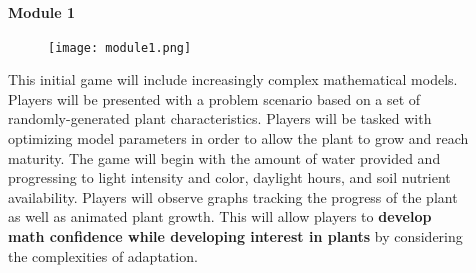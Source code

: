\documentclass[final]{beamer}
\newlength{\sepwid}
\newlength{\onecolwid}
\newlength{\twocolwid}
\begin{document}
\begin{frame}[t]
\begin{columns}[t]
\begin{column}{\onecolwid}
\begin{alertblock}{\color{Grey}\textbf{Module 1}}
	
	\begin{figure}
		\texttt{[image: module1.png]}
	\end{figure}
	{\small This initial game will include increasingly complex mathematical models. Players will be presented with a problem scenario based on a set of randomly-generated plant characteristics. Players will be tasked with optimizing model parameters in order to allow the plant to grow and reach maturity. The game will begin with the amount of water provided and progressing to light intensity and color, daylight hours, and soil nutrient availability. Players will observe graphs tracking the progress of the plant as well as animated plant growth. This will allow players to \textbf{develop math confidence while developing interest in plants} by considering the complexities of adaptation.}
\end{alertblock}





\end{column} %

\begin{column}{\sepwid}\end{column} %

\begin{column}{\twocolwid} %
%

\begin{columns}[t,totalwidth=\twocolwid] %

\begin{column}{\onecolwid}\vspace{-.6in} %





\end{column}
\end{columns}
\end{column}
\end{columns}
\end{frame}
\end{document}
